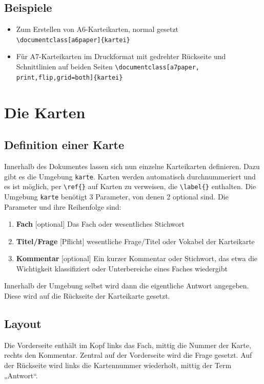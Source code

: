 \documentclass[a4paper,DIV=calc]{scrartcl}
\newcommand{\befehl}[1]{%
\marginpar{\textsf{#1}}%
}
\begin{document}
\subsection{Beispiele}
\begin{itemize}
	\item Zum Erstellen von A6-Karteikarten, normal gesetzt \lstinline!\documentclass[a6paper]{kartei}!
	\item Für A7-Karteikarten im Druckformat mit gedrehter Rückseite und Schnittlinien auf beiden Seiten \lstinline!\documentclass[a7paper, print,flip,grid=both]{kartei}!
\end{itemize}
%
%
%
\section{Die Karten}

\subsection{Definition einer Karte}\befehl{\textbackslash begin\{karte\}}

Innerhalb des Dokumentes lassen sich nun einzelne Karteikarten definieren. Dazu gibt es die Umgebung \lstinline!karte!. Karten werden automatisch durchnummeriert und es ist möglich, per \lstinline!\ref{}! auf Karten zu verweisen, die \lstinline!\label{}! enthalten.
Die Umgebung \lstinline!karte! benötigt 3 Parameter, von denen 2 optional sind. Die Parameter und ihre Reihenfolge sind:
\begin{enumerate}[1.]
	\item \textbf{Fach} [optional] Das Fach oder wesentliches Stichwort
	\item \textbf{Titel/Frage} [Pflicht] wesentliche Frage/Titel oder Vokabel der Karteikarte
	\item \textbf{Kommentar} [optional] Ein kurzer Kommentar oder Stichwort, das etwa die Wichtigkeit klassifiziert oder Unterbereiche eines Faches wiedergibt
\end{enumerate}
Innerhalb der Umgebung selbst wird dann die eigentliche Antwort angegeben. Diese wird auf die Rückseite der Karteikarte gesetzt.

\subsection{Layout}
Die Vorderseite enthält im Kopf links das Fach, mittig die Nummer der Karte, rechts den Kommentar. Zentral auf der Vorderseite wird die Frage gesetzt. Auf der Rückseite wird links die Kartennummer wiederholt, mittig der Term „Antwort“.
\end{document}
